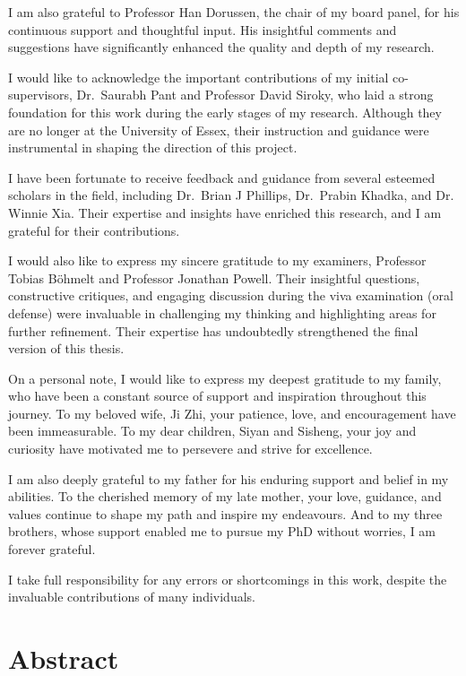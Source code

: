 \documentclass[
  12pt,
]{report}
\begin{document}
I am also grateful to Professor Han Dorussen, the chair of my board
panel, for his continuous support and thoughtful input. His insightful
comments and suggestions have significantly enhanced the quality and
depth of my research.

I would like to acknowledge the important contributions of my initial
co-supervisors, Dr.~Saurabh Pant and Professor David Siroky, who laid a
strong foundation for this work during the early stages of my research.
Although they are no longer at the University of Essex, their
instruction and guidance were instrumental in shaping the direction of
this project.

I have been fortunate to receive feedback and guidance from several
esteemed scholars in the field, including Dr.~Brian J Phillips,
Dr.~Prabin Khadka, and Dr. Winnie Xia. Their expertise and insights have
enriched this research, and I am grateful for their contributions.

I would also like to express my sincere gratitude to my examiners,
Professor Tobias Böhmelt and Professor Jonathan Powell. Their insightful
questions, constructive critiques, and engaging discussion during the
viva examination (oral defense) were invaluable in challenging my
thinking and highlighting areas for further refinement. Their expertise
has undoubtedly strengthened the final version of this thesis.

On a personal note, I would like to express my deepest gratitude to my
family, who have been a constant source of support and inspiration
throughout this journey. To my beloved wife, Ji Zhi, your patience,
love, and encouragement have been immeasurable. To my dear children,
Siyan and Sisheng, your joy and curiosity have motivated me to persevere
and strive for excellence.

I am also deeply grateful to my father for his enduring support and
belief in my abilities. To the cherished memory of my late mother, your
love, guidance, and values continue to shape my path and inspire my
endeavours. And to my three brothers, whose support enabled me to pursue
my PhD without worries, I am forever grateful.

I take full responsibility for any errors or shortcomings in this work,
despite the invaluable contributions of many individuals.

\chapter*{Abstract}\label{abstract}
\end{document}
